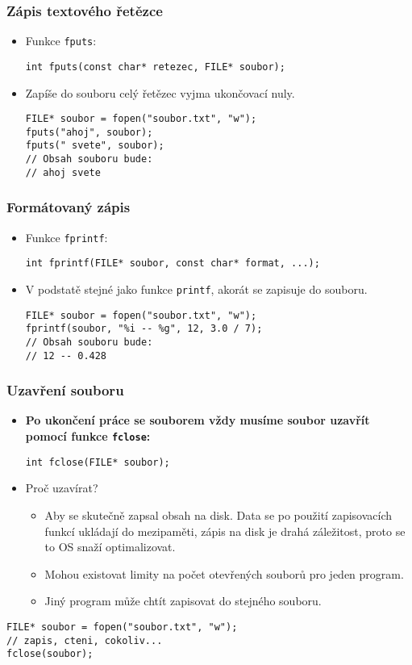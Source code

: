 \documentclass{beamer}
\newenvironment{itemizex}%
  {\large \begin{itemize}%
    \setlength{\itemsep}{8pt}%
    \setlength{\parskip}{8pt}}%
  {\end{itemize}}
\begin{document}
\begin{frame}[t,fragile]\frametitle{Zápis textového řetězce} 
    \begin{itemizex}
        \item Funkce \texttt{fputs}:
\begin{verbatim} 
int fputs(const char* retezec, FILE* soubor);
\end{verbatim}
        \item Zapíše do souboru celý řetězec vyjma ukončovací nuly.
\begin{verbatim} 
FILE* soubor = fopen("soubor.txt", "w");
fputs("ahoj", soubor);
fputs(" svete", soubor);
// Obsah souboru bude:
// ahoj svete
\end{verbatim}
    \end{itemizex}
\end{frame}


\begin{frame}[t,fragile]\frametitle{Formátovaný zápis} 
    \begin{itemizex}
        \item Funkce \texttt{fprintf}:
\begin{verbatim} 
int fprintf(FILE* soubor, const char* format, ...);
\end{verbatim}
        \item V podstatě stejné jako funkce \texttt{printf}, akorát se zapisuje do souboru.
\begin{verbatim} 
FILE* soubor = fopen("soubor.txt", "w");
fprintf(soubor, "%i -- %g", 12, 3.0 / 7);
// Obsah souboru bude:
// 12 -- 0.428
\end{verbatim}
    \end{itemizex}
\end{frame}


\begin{frame}[t,fragile]\frametitle{Uzavření souboru} 
    \begin{itemize}
        \item \textbf{Po ukončení práce se souborem vždy musíme soubor uzavřít pomocí funkce \texttt{fclose}:} 
\begin{verbatim} 
int fclose(FILE* soubor);
\end{verbatim}
        \item Proč uzavírat? 
            \begin{itemize}
                \item Aby se skutečně zapsal obsah na disk. Data se po použití zapisovacích funkcí ukládají do mezipaměti, zápis na disk je drahá záležitost, proto se to OS snaží optimalizovat.
                \item Mohou existovat limity na počet otevřených souborů pro jeden program.
                \item Jiný program může chtít zapisovat do stejného souboru.
            \end{itemize}
    \end{itemize}
\begin{verbatim} 
FILE* soubor = fopen("soubor.txt", "w");
// zapis, cteni, cokoliv... 
fclose(soubor);
\end{verbatim}
\end{frame}
\end{document}
